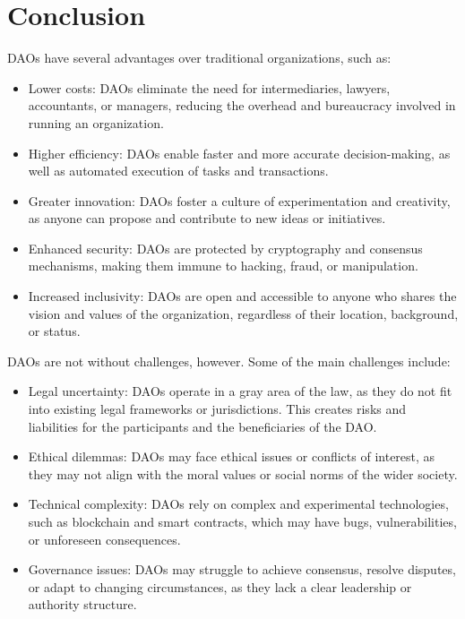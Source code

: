 \documentclass[lettersize,journal]{IEEEtran}
\begin{document}
\section{Conclusion}


DAOs have several advantages over traditional organizations, such as:

\begin{itemize}
\item{Lower costs: DAOs eliminate the need for intermediaries, lawyers, accountants, or managers, reducing the overhead and bureaucracy involved in running an organization.}
\item{Higher efficiency: DAOs enable faster and more accurate decision-making, as well as automated execution of tasks and transactions.}
\item{Greater innovation: DAOs foster a culture of experimentation and creativity, as anyone can propose and contribute to new ideas or initiatives.}
\item{Enhanced security: DAOs are protected by cryptography and consensus mechanisms, making them immune to hacking, fraud, or manipulation.}
\item{Increased inclusivity: DAOs are open and accessible to anyone who shares the vision and values of the organization, regardless of their location, background, or status.}
\end{itemize}

DAOs are not without challenges, however. Some of the main challenges include:

\begin{itemize}
\item{Legal uncertainty: DAOs operate in a gray area of the law, as they do not fit into existing legal frameworks or jurisdictions. This creates risks and liabilities for the participants and the beneficiaries of the DAO.}
\item{Ethical dilemmas: DAOs may face ethical issues or conflicts of interest, as they may not align with the moral values or social norms of the wider society.}
\item{Technical complexity: DAOs rely on complex and experimental technologies, such as blockchain and smart contracts, which may have bugs, vulnerabilities, or unforeseen consequences.}
\item{Governance issues: DAOs may struggle to achieve consensus, resolve disputes, or adapt to changing circumstances, as they lack a clear leadership or authority structure.}
\end{itemize}
\end{document}
